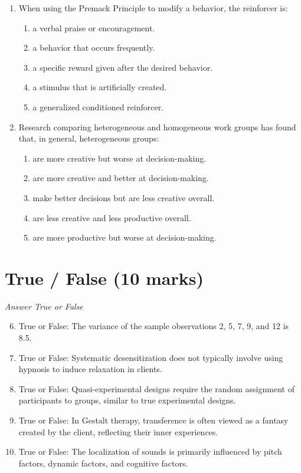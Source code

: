 \documentclass[12pt]{article}
\begin{document}
\begin{enumerate}[label=\arabic*.]
\begin{enumerate}[label=(\alph*)]
    \item identifying the strengths and weaknesses of the consultee's current approach
\end{enumerate}
\item When using the Premack Principle to modify a behavior, the reinforcer is:
\begin{enumerate}[label=(\alph*)]
    \item a verbal praise or encouragement.
    \item a behavior that occurs frequently.
    \item a specific reward given after the desired behavior.
    \item a stimulus that is artificially created.
    \item a generalized conditioned reinforcer.
\end{enumerate}
\item Research comparing heterogeneous and homogeneous work groups has found that, in general, heterogeneous groups:
\begin{enumerate}[label=(\alph*)]
    \item are more creative but worse at decision-making.
    \item are more creative and better at decision-making.
    \item make better decisions but are less creative overall.
    \item are less creative and less productive overall.
    \item are more productive but worse at decision-making.
\end{enumerate}
\end{enumerate}

\section*{True / False (10 marks)}
\textit{Answer True or False}
\begin{enumerate}[label=\arabic*.]
\setcounter{enumi}{5}
\item True or False: The variance of the sample observations 2, 5, 7, 9, and 12 is 8.5.
\item True or False: Systematic desensitization does not typically involve using hypnosis to induce relaxation in clients.
\item True or False: Quasi-experimental designs require the random assignment of participants to groups, similar to true experimental designs.
\item True or False: In Gestalt therapy, transference is often viewed as a fantasy created by the client, reflecting their inner experiences.
\item True or False: The localization of sounds is primarily influenced by pitch factors, dynamic factors, and cognitive factors.
\end{enumerate}
\end{document}

